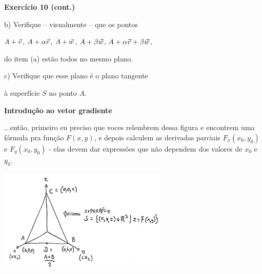 \documentclass[oneside,12pt]{article}
\begin{document}
\newpage

{\bf Exercício 10 (cont.)}

\msk

b) Verifique -- visualmente -- que os pontos

$A+{\vec v}$, $A+\alpha{\vec v}$, $A+{\vec w}$, $A+\beta{\vec w}$, $A+\alpha{\vec v}+\beta{\vec w}$, 

do item (a) estão todos no mesmo plano.

\msk

c) Verifique que esse plano é o plano tangente

à superfície $S$ no ponto $A$.


\newpage


\newpage


{\bf Introdução ao vetor gradiente}

...então, primeiro eu preciso que voces relembrem dessa figura e
encontrem uma fórmula pra função $F(x,y)$, e depois calculem as
derivadas parciais $F_x(x_0,y_0)$ e $F_y(x_0,y_0)$ - elas devem dar
expressões que não dependem dos valores de $x_0$ e $y_0$.

\includegraphics[height=5cm]{2020-2-C3/20210430_grad_superficie_orig.pdf}

\newpage
\end{document}
